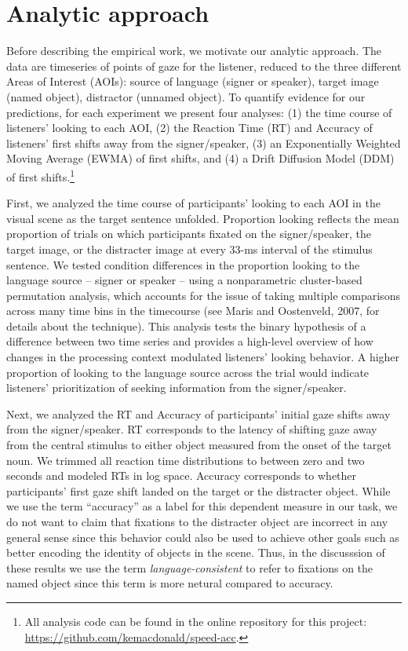 \documentclass[,man,floatsintext]{apa6}
\let\rmarkdownfootnote\footnote%
\def\footnote{\protect\rmarkdownfootnote}
\begin{document}
\hypertarget{analytic-approach}{%
\section{Analytic approach}\label{analytic-approach}}

Before describing the empirical work, we motivate our analytic approach.
The data are timeseries of points of gaze for the listener, reduced to
the three different Areas of Interest (AOIs): source of language (signer
or speaker), target image (named object), distractor (unnamed object).
To quantify evidence for our predictions, for each experiment we present
four analyses: (1) the time course of listeners' looking to each AOI,
(2) the Reaction Time (RT) and Accuracy of listeners' first shifts away
from the signer/speaker, (3) an Exponentially Weighted Moving Average
(EWMA) of first shifts, and (4) a Drift Diffusion Model (DDM) of first
shifts.\footnote{All analysis code can be found in the online repository
  for this project: \url{https://github.com/kemacdonald/speed-acc}.}

First, we analyzed the time course of participants' looking to each AOI
in the visual scene as the target sentence unfolded. Proportion looking
reflects the mean proportion of trials on which participants fixated on
the signer/speaker, the target image, or the distracter image at every
33-ms interval of the stimulus sentence. We tested condition differences
in the proportion looking to the language source -- signer or speaker --
using a nonparametric cluster-based permutation analysis, which accounts
for the issue of taking multiple comparisons across many time bins in
the timecourse (see Maris and Oostenveld, 2007, for details about the
technique). This analysis tests the binary hypothesis of a difference
between two time series and provides a high-level overview of how
changes in the processing context modulated listeners' looking behavior.
A higher proportion of looking to the language source across the trial
would indicate listeners' prioritization of seeking information from the
signer/speaker.

Next, we analyzed the RT and Accuracy of participants' initial gaze
shifts away from the signer/speaker. RT corresponds to the latency of
shifting gaze away from the central stimulus to either object measured
from the onset of the target noun. We trimmed all reaction time
distributions to between zero and two seconds and modeled RTs in log
space. Accuracy corresponds to whether participants' first gaze shift
landed on the target or the distracter object. While we use the term
\enquote{accuracy} as a label for this dependent measure in our task, we
do not want to claim that fixations to the distracter object are
incorrect in any general sense since this behavior could also be used to
achieve other goals such as better encoding the identity of objects in
the scene. Thus, in the discusssion of these results we use the term
\emph{language-consistent} to refer to fixations on the named object
since this term is more netural compared to accuracy.
\end{document}
